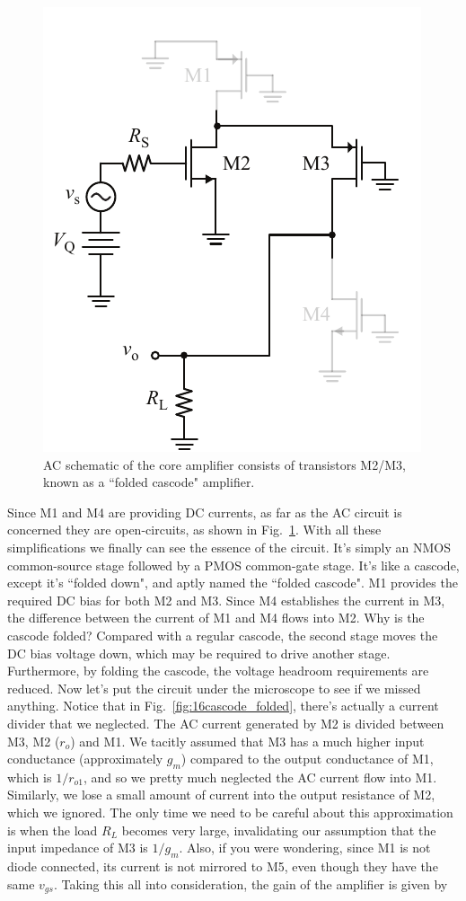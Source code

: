 \begin{figure}[tb]
\centering
\includegraphics[scale=1]{19cascode_folded_ac}
\caption{AC schematic of the core amplifier consists of transistors M2/M3, known as a ``folded cascode" amplifier.}
\label{fig:19cascode_folded_ac}
\end{figure}
Since M1 and M4 are providing DC currents, as far as the AC circuit is concerned they are open-circuits, as shown in Fig.~\ref{fig:19cascode_folded_ac}.  With all these simplifications we finally can see the essence of the circuit. It's simply an NMOS common-source stage followed by a PMOS common-gate stage.  It's like a cascode, except it's ``folded down", and aptly named the ``folded cascode".  M1 provides the required DC bias for both M2 and M3.  Since M4 establishes the current in M3, the difference between the current of M1 and M4 flows into M2.
Why is the cascode folded?  Compared with a regular cascode, the second stage moves the DC bias voltage down, which may be required to drive another stage.  Furthermore, by folding the cascode, the voltage headroom requirements are reduced.
Now let's put the circuit under the microscope to see if we missed anything.  Notice that in Fig.~\ref{fig:16cascode_folded}, there's actually a current divider that we neglected.  The AC current generated by M2 is divided between M3, M2 ($r_o$) and M1.  We tacitly assumed that M3 has a much higher input conductance (approximately $g_m$) compared to the output conductance of M1, which is $1/r_{o1}$, and so we pretty much neglected the AC current flow into M1.  Similarly, we lose a small amount of current into the output resistance of M2, which we ignored.  The only time we need to be careful about this approximation is when the load $R_L$ becomes very large, invalidating our assumption that the input impedance of M3 is $1/g_m$.  Also, if you were wondering, since M1 is not diode connected, its current is not mirrored to M5, even though they have the same $v_{gs}$.  Taking this all into consideration, the gain of the amplifier is given by
